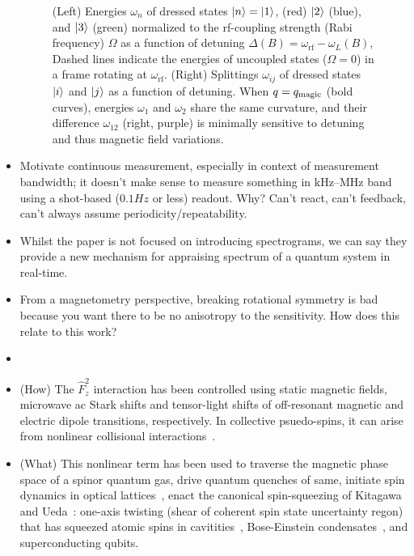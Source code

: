 \documentclass[aps,prl,reprint,superscriptaddress,floatfix]{revtex4-1}
\begin{document}
\begin{itemize}
\begin{figure}
{        (Left) Energies $\omega_n$ of dressed states $\vert n \rangle =\vert 1 \rangle $, (red) $\vert 2 \rangle $ (blue), and $\vert 3 \rangle $ (green) normalized to the rf-coupling strength (Rabi frequency) $\Omega$ as a function of detuning $\Delta(B)=\omega_{\text{rf}}-\omega_L(B)$,
        Dashed lines indicate the energies of uncoupled states ($\Omega=0$) in a frame rotating at $\omega_{\text{rf}}$.
        (Right) Splittings $\omega_{ij}$ of dressed states $\vert i \rangle $ and $\vert j \rangle $ as a function of detuning.
        When $q=q_{\text{magic}}$ (bold curves), energies $\omega_1$ and $\omega_2$ share the same curvature, and their difference $\omega_{12}$ (right, purple) is minimally sensitive to detuning and thus magnetic field variations. 
    }
\end{figure}

    \item Motivate continuous measurement, especially in context of measurement bandwidth; it doesn't make sense to measure something in kHz--MHz band using a shot-based ($0.1\unit{Hz}$ or less) readout. Why? Can't react, can't feedback, can't always assume periodicity/repeatability.
    \item Whilst the paper is not focused on introducing spectrograms, we can say they provide a new mechanism for appraising spectrum of a quantum system in real-time. 
    \item From a magnetometry perspective, breaking rotational symmetry is bad because you want there to be no anisotropy to the sensitivity. How does this relate to this work?
    \item {}
    \item (How) The $\hat{F}_z^2$ interaction has been controlled using static magnetic fields, microwave ac Stark shifts and tensor-light shifts of off-resonant magnetic and electric dipole transitions, respectively. In collective psuedo-spins, it can arise from nonlinear collisional interactions~\cite{riedel_atom-chip-based_2010,*gross_nonlinear_2010}.
    \item (What) This nonlinear term has been used to traverse the magnetic phase space of a spinor quantum gas, drive quantum quenches of same, initiate spin dynamics in optical lattices~\cite{gerbier_resonant_2006}, enact the canonical spin-squeezing of Kitagawa and Ueda~\cite{kitagawa_squeezed_1993}: one-axis twisting (shear of coherent spin state uncertainty regon) that has squeezed atomic spins in cavitities~\cite{leroux_implementation_2010}, Bose-Einstein condensates~\cite{riedel_atom-chip-based_2010,*gross_nonlinear_2010}, and superconducting qubits.
\end{itemize}
\end{document}
